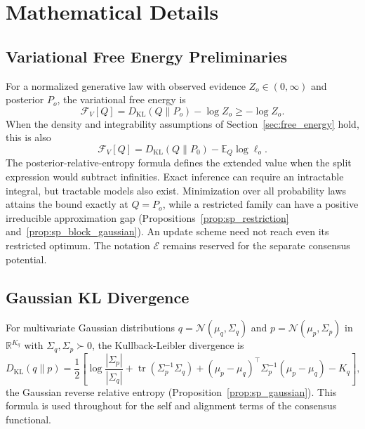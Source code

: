 \section{Mathematical Details}
\label{app:math}

\subsection{Variational Free Energy Preliminaries}
\label{app:variational_prelim}

For a normalized generative law with observed evidence $Z_o\in(0,\infty)$ and posterior $P_o$, the variational free energy is
\begin{equation}
\mathcal F_V[Q]=D_{\mathrm{KL}}(Q\|P_o)-\log Z_o\ge-\log Z_o.
\end{equation}
When the density and integrability assumptions of Section~\ref{sec:free_energy} hold, this is also
\begin{equation}
\mathcal F_V[Q]=D_{\mathrm{KL}}(Q\|P_0)-\mathbb E_Q\log\ell_o.
\end{equation}
The posterior-relative-entropy formula defines the extended value when the split expression would subtract infinities. Exact inference can require an intractable integral, but tractable models also exist. Minimization over all probability laws attains the bound exactly at $Q=P_o$, while a restricted family can have a positive irreducible approximation gap (Propositions~\ref{prop:sp_restriction} and~\ref{prop:sp_block_gaussian}). An update scheme need not reach even its restricted optimum. The notation $\mathcal E$ remains reserved for the separate consensus potential.

\subsection{Gaussian KL Divergence}
\label{app:gaussian_kl}

For multivariate Gaussian distributions $q = \mathcal{N}(\mu_q, \Sigma_q)$ and $p = \mathcal{N}(\mu_p, \Sigma_p)$ in $\mathbb{R}^{K_q}$ with $\Sigma_q,\Sigma_p\succ0$, the Kullback-Leibler divergence is
\begin{equation}
D_{\mathrm{KL}}(q \| p) = \frac{1}{2}\left[\log\frac{|\Sigma_p|}{|\Sigma_q|} + \operatorname{tr}(\Sigma_p^{-1}\Sigma_q) + (\mu_p - \mu_q)^\top\Sigma_p^{-1}(\mu_p - \mu_q) - K_q\right],
\end{equation}
the Gaussian reverse relative entropy (Proposition~\ref{prop:sp_gaussian}). This formula is used throughout for the self and alignment terms of the consensus functional.


